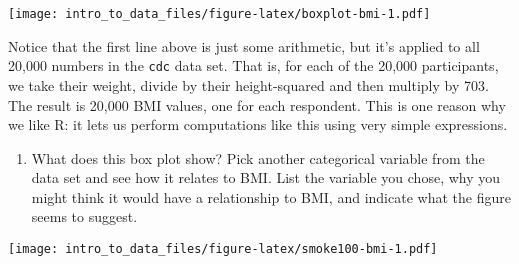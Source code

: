 \documentclass[]{article}
\newenvironment{Shaded}{\begin{snugshade}}{\end{snugshade}}
\newcommand{\KeywordTok}[1]{\textcolor[rgb]{0.13,0.29,0.53}{\textbf{#1}}}
\newcommand{\DataTypeTok}[1]{\textcolor[rgb]{0.13,0.29,0.53}{#1}}
\newcommand{\DecValTok}[1]{\textcolor[rgb]{0.00,0.00,0.81}{#1}}
\newcommand{\StringTok}[1]{\textcolor[rgb]{0.31,0.60,0.02}{#1}}
\newcommand{\OperatorTok}[1]{\textcolor[rgb]{0.81,0.36,0.00}{\textbf{#1}}}
\newcommand{\NormalTok}[1]{#1}
\providecommand{\tightlist}{%
  \setlength{\itemsep}{0pt}\setlength{\parskip}{0pt}}
\begin{document}
\begin{Shaded}
\end{Shaded}

\texttt{[image: intro\_to\_data\_files/figure-latex/boxplot-bmi-1.pdf]}

Notice that the first line above is just some arithmetic, but it's
applied to all 20,000 numbers in the \texttt{cdc} data set. That is, for
each of the 20,000 participants, we take their weight, divide by their
height-squared and then multiply by 703. The result is 20,000 BMI
values, one for each respondent. This is one reason why we like R: it
lets us perform computations like this using very simple expressions.

\begin{enumerate}
\def\labelenumi{\arabic{enumi}.}
\setcounter{enumi}{3}
\tightlist
\item
  What does this box plot show? Pick another categorical variable from
  the data set and see how it relates to BMI. List the variable you
  chose, why you might think it would have a relationship to BMI, and
  indicate what the figure seems to suggest.
\end{enumerate}

\begin{Shaded}
\end{Shaded}

\texttt{[image: intro\_to\_data\_files/figure-latex/smoke100-bmi-1.pdf]}
\end{document}
